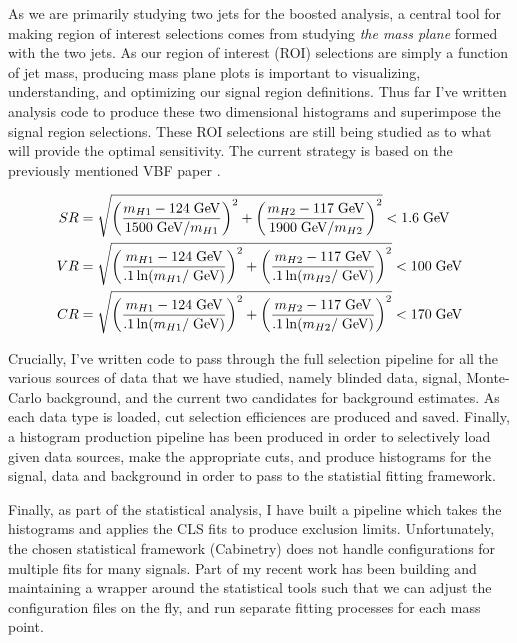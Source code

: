 \documentclass[12pt]{article}
\begin{document}
As we are primarily studying two jets for the boosted analysis, a central tool
for making region of interest selections comes from studying \textit{the mass
plane} formed with the two jets. As our region of interest (ROI) selections are
simply a function of jet mass, producing mass plane plots is important to
visualizing, understanding, and optimizing our signal region definitions. Thus
far I've written analysis code to produce these two dimensional histograms and
superimpose the signal region selections. These ROI selections are still being
studied as to what will provide the optimal sensitivity. The current strategy is
based on the previously mentioned VBF paper \cite{atlas_hhbbbb_vbf}.

\begin{align}
    SR &= \sqrt{\left( \frac{m_{H1}-124\;\text{GeV}}{1500\;\text{GeV}/m_{H1}}
    \right)^2 + \left( \frac{m_{H2}-117\;\text{GeV}}{1900\;\text{GeV}/m_{H2}}
    \right)^2} < 1.6 \;\text{GeV} \\
    VR &= \sqrt{\left( \frac{m_{H1}-124\;\text{GeV}}{.1\ln(m_{H1}/\;\text{GeV})}
    \right)^2 + \left( \frac{m_{H2}-117\;\text{GeV}}{.1\ln(m_{H2}/\;\text{GeV})}
    \right)^2} < 100 \;\text{GeV} \\
    CR &= \sqrt{\left( \frac{m_{H1}-124\;\text{GeV}}{.1\ln(m_{H1}/\;\text{GeV})}
    \right)^2 + \left( \frac{m_{H2}-117\;\text{GeV}}{.1\ln(m_{H2}/\;\text{GeV})}
    \right)^2} < 170 \;\text{GeV}
\end{align}

Crucially, I've written code to pass through the full selection pipeline for all
the various sources of data that we have studied, namely blinded data, signal,
Monte-Carlo background, and the current two candidates for background estimates.
As each data type is loaded, cut selection efficiences are produced and saved.
Finally, a histogram production pipeline has been produced in order to
selectively load given data sources, make the appropriate cuts, and produce
histograms for the signal, data and background in order to pass to the
statistial fitting framework. %

Finally, as part of the statistical analysis, I have built a pipeline which
takes the histograms and applies the CLS fits to produce exclusion limits.
Unfortunately, the chosen statistical framework (Cabinetry) \cite{cabinetry}
does not handle configurations for multiple fits for many signals. Part of my
recent work has been building and maintaining a wrapper around the statistical
tools such that we can adjust the configuration files on the fly, and run
separate fitting processes for each mass point.
\end{document}
